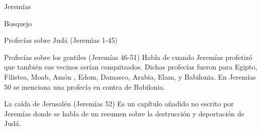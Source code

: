 \begin{section}{Jeremías}
\begin{subsection}{Bosquejo}
\begin{subsubsection}{Profecías sobre Judá (Jeremías 1-45)}
\begin{enumerate}
			\end{enumerate}
		\end{subsubsection}
		\begin{subsubsection}{Profecías sobre los gentiles (Jeremías 46-51)}
			Habla de cuando Jeremías profetizó que también sus vecinos serían conquitsados. Dichas profecías fueron para Egipto, Filistea, Moab, Amón , Edom, Damasco, Arabia, Elam, y Babilonia.
			En Jeremías 50 se menciona una profecía en contra de Babilonia.
		\end{subsubsection}
		\begin{subsubsection}{La caída de Jerusalén (Jeremías 52)}
			Es un capítulo añadido no escrito por Jeremías donde se habla de un resumen sobre la destrucción y deportación de Judá.
		\end{subsubsection}
	\end{subsection}
\end{section}
%


